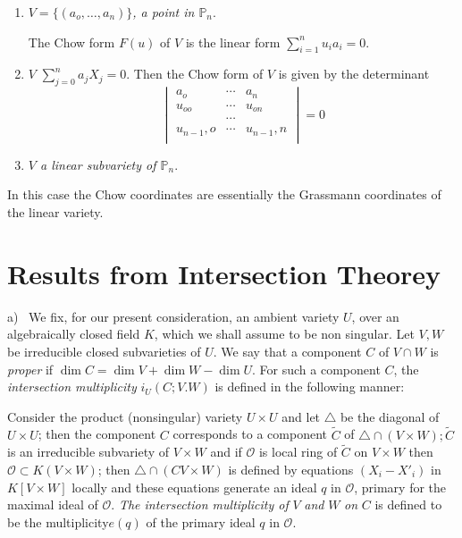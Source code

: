 {\begin{example*}
  \begin{enumerate}[\rm a)]
  \item {\em $V=\{(a_o,\ldots,a_n)\}$, a point in $\mathbb{P}_n$}.

    The Chow form $F(u)$ of $V$ is the linear form  $\sum
    \limits_{i=1}^{n} u_i a_i=0$. 
  \item $V$ $\sum \limits_{j=0}^{n}a_j
    X_j=0$. Then the Chow form of $V$ is given by the determinant  
    $$
    \begin{vmatrix}
      a_o & \cdots & a_n\\
      u_{oo} & \cdots & u_{on}\\
      & \cdots &\\
      u_{n-1},o & \cdots & u_{n-1},n\\
    \end{vmatrix}
    =0
    $$
  \item {\em $V$ a linear subvariety of $\mathbb{P}_n$}.
  \end{enumerate} 
\end{example*}

In this case the Chow coordinates are essentially the Grassmann
coordinates of the linear variety. 

\section{Results from Intersection Theorey}\label{chap1:sec4}%

a)~ We fix, for our present consideration, an ambient variety $U$, over
an algebraically  closed field $K$, which we shall assume to be non
singular. Let $V,W$ be irreducible closed subvarieties of $U$. We say
that   a component $C$ of $V \cap W$ is \textit{proper} if $\dim
C=\dim V+\dim W-\dim U$. For such a component $C$, the
\textit{intersection multiplicity} $i_U(C;V.W)$ is defined in the
following manner: 

Consider the product (nonsingular) variety $U \times U$ and let
$\triangle$ be the diagonal of $U \times U$; then the component $C$
corresponds to a component $\tilde{C}$ of $\triangle \cap (V \times
W);\tilde{C}$ is an irreducible subvariety of $V \times W$ and  if
$\mathscr{O}$ is  local ring of $\tilde{C}$ on $V \times W$ then
$\mathscr{O}\subset K(V \times W)$; then $\triangle \cap (CV \times
W)$ is defined by equations $(X_i-X'_i)$ in  $K[V \times W]$ locally and
these equations generate an ideal $q$ in $\mathscr{O}$, primary for the
maximal ideal of $\mathscr{O}$. \textit{The intersection multiplicity
  of} $V$ \textit{and} $W$ \textit{on} $C$ is defined to be the
multiplicity\pageoriginale $e(q)$ of the primary ideal $q$ in $\mathscr{O}$. 

}
